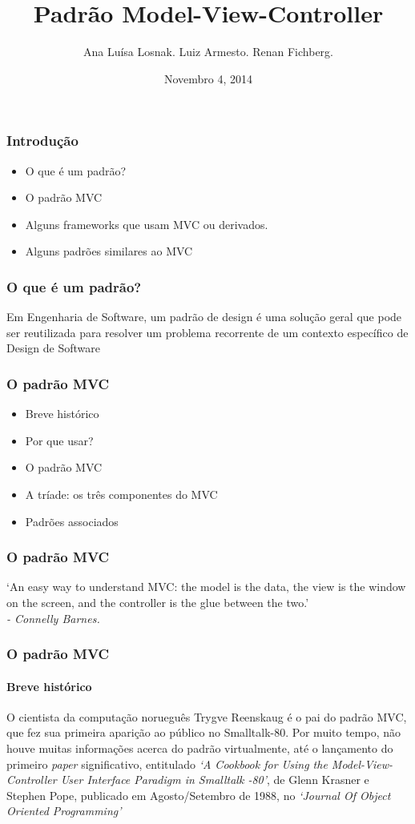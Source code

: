 \documentclass{beamer}
\title[Padrão Model-View-Controller]{Padrão Model-View-Controller}
\author{Ana Luísa Losnak. Luiz Armesto. Renan Fichberg.}
\date{Novembro 4, 2014}
\institute{Instituto de Matemática e Estatística da Universidade de São Paulo (IME-USP)}
\begin{document}
\begin{frame}
\titlepage
\end{frame}

\begin{frame}
\frametitle{Introdução}
\begin{itemize}
	\item O que é um padrão?
	\item O padrão MVC
	\item Alguns frameworks que usam MVC ou derivados.
	\item Alguns padrões similares ao MVC
\end{itemize}
\end{frame}

\begin{frame}
\frametitle{O que é um padrão?}
	Em Engenharia de Software, um padrão de design é uma solução geral que pode ser reutilizada para resolver um problema recorrente de um contexto específico de Design de Software
\end{frame}

\begin{frame}
\frametitle{O padrão MVC}
\begin{itemize}
	\item Breve histórico
	\item Por que usar?
	\item O padrão MVC
	\item A tríade: os três componentes do MVC
	\item Padrões associados
\end{itemize}
\end{frame}

\begin{frame}
\frametitle{O padrão MVC}
	`An easy way to understand MVC: the model is the data, the view is the window on the screen, and the controller is the glue between the two.' \\
	\hfill \textit{- Connelly Barnes.}
\end{frame}


\begin{frame}
\frametitle{O padrão MVC}
\framesubtitle{Breve histórico}
	O cientista da computação norueguês Trygve Reenskaug é o pai do padrão MVC, que fez sua primeira aparição ao público no Smalltalk-80. Por muito tempo, não houve
	muitas informações acerca do padrão virtualmente, até o lançamento do primeiro \textit{paper} significativo, entitulado \textit{`A Cookbook for Using the Model-View-Controller User Interface Paradigm in Smalltalk -80'}, de Glenn Krasner e Stephen Pope, publicado em Agosto/Setembro de 1988, no \textit{`Journal Of Object Oriented Programming'}
\end{frame}
\end{document}

